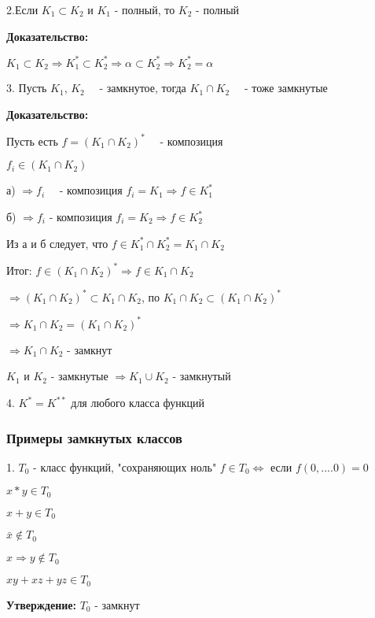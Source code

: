 \documentclass[russian]{lecture-notes}
\begin{document}
	2.Если $K_{1} \subset K_{2}$ и $K_{1}$ - полный, то $K_{2}$ - полный

	\textbf{Доказательство:}

	$K_{1} \subset K_{2} \Rightarrow K_{1}^{*} \subset K_{2}^{*} \Rightarrow \alpha
	 \subset K_{2}^{*} \Rightarrow K_{2}^{*} = \alpha
	$

	3. Пусть $K_{1}$, $K_{2}$ ~~- замкнутое, тогда $K_{1} \cap K_{2}$ ~~- тоже замкнутые

	\textbf{Доказательство:}

	Пусть есть $f = (K_{1} \cap K_{2})^{*} $ ~~- композиция

	$f_i \in (K_{1} \cap K_{2})$

	а) $\Rightarrow f_i $ ~~- композиция $ f_i = K_1 \Rightarrow f \in K_{1}^{*}$

	б) $\Rightarrow f_i $ - композиция $f_i = K_2 \Rightarrow f \in K_{2}^{*}$

	Из а и б следует, что $ f \in K_{1}^{*} \cap K_{2}^{*} = K_{1} \cap K_{2}$

	Итог: $f \in (K_{1} \cap K_{2})^{*} \Rightarrow f \in K_{1} \cap K_{2}$ 

	$\Rightarrow	(K_{1} \cap K_{2})^{*} \subset K_{1} \cap K_{2}$, 
	по $K_{1} \cap K_{2} \subset (K_{1}
	\cap K_{2})^{*}$ 
	
	$\Rightarrow K_{1} \cap K_{2} = (K_{1} \cap K_{2})^{*}$
	
	$\Rightarrow K_{1} \cap K_{2} $ - замкнут

	\begin{remark}
		$K_{1}$ и $K_{2}$ - замкнутые $\Rightarrow K_{1} \cup K_{2} $ - замкнутый
		\end{remark}

	4. $K^{*} = K^{**}$ для любого класса функций

	\subsubsection{Примеры замкнутых классов}

	1. $T_{0}$ - класс функций, "сохраняющих ноль" $f \in T_{0} \Leftrightarrow$  если
	$f(0,....0) = 0$

	$x*y \in T_{0}$

	$x+y \in T_{0}$

	$\bar{x} \notin T_{0}$

	$x \Rightarrow y \notin T_{0}$

	$xy + xz + yz \in T_{0}$

	\textbf{Утверждение:} $T_{0} $ - замкнут
\end{document}
